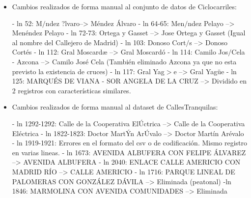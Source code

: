 \begin{itemize}

\item Cambios realizados de forma manual al conjunto de datos de Ciclocarriles:
\begin{tiny}
\newline - ln 52: M$/$ndez ?lvaro--> Méndez Álvaro
\newline - ln 64-65: Men$/$ndez Pelayo --> Menéndez Pelayo
\newline - ln 72-73: Ortega y Gasset --> Jose Ortega y Gasset (Igual al nombre del Callejero de Madrid)
\newline - ln 103: Donoso Cort$/$s --> Donoso Cortés
\newline - ln 112: Gral Moscardæ --> Gral Moscardó
\newline - ln 114: Camilo Jos$/$Cela - Azcona --> Camilo José Cela (También eliminado Azcona ya que no esta previsto la existencia de cruces)
\newline - ln 117: Gral Yag$>$e --> Gral Yagüe
\newline - ln 125: MARQUÉS DE VIANA - SOR ANGELA DE LA CRUZ --> Dividido en 2 registros con características similares.
\newline
\end{tiny}


    \item Cambios realizados de forma manual al dataset de CallesTranquilas:
\begin{tiny}
\newline - ln 1292-1292: Calle de la Cooperativa ElÚctrica --> Calle de la Cooperativa Eléctrica
\newline - ln 1822-1823: Doctor MartÝn ArÚvalo --> Doctor Martín Arévalo
\newline - ln 1919-1921: Errores en el formato del csv o de codificación. Mismo registro en varias lineas.
\newline     - ln 1673: AVENIDA ALBUFERA CON FELIPE ÁLVAREZ --> AVENIDA ALBUFERA
\newline - ln 2040: ENLACE CALLE AMERICIO CON MADRID RÍO --> CALLE AMERICIO
- ln 1716: PARQUE LINEAL DE PALOMERAS CON GONZÁLEZ DÁVILA --> Eliminada (peatonal)
-ln 1846: MARMOLINA CON AVENIDA COMUNIDADES --> Eliminada
\end{tiny}



\end{itemize}
